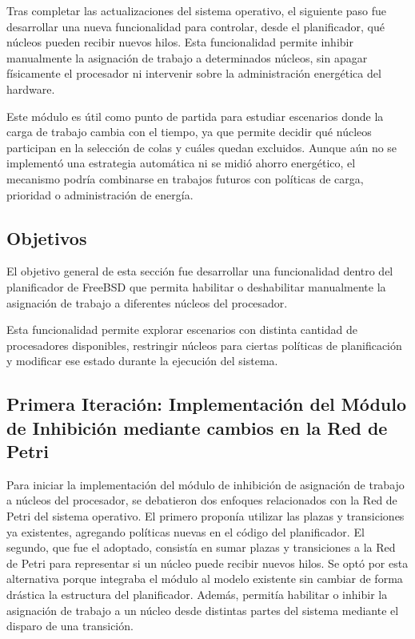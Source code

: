 Tras completar las actualizaciones del sistema operativo, el siguiente paso fue desarrollar una nueva funcionalidad para controlar, desde el planificador, qué núcleos pueden recibir nuevos hilos. Esta funcionalidad permite inhibir manualmente la asignación de trabajo a determinados núcleos, sin apagar físicamente el procesador ni intervenir sobre la administración energética del hardware.\par

Este módulo es útil como punto de partida para estudiar escenarios donde la carga de trabajo cambia con el tiempo, ya que permite decidir qué núcleos participan en la selección de colas y cuáles quedan excluidos. Aunque aún no se implementó una estrategia automática ni se midió ahorro energético, el mecanismo podría combinarse en trabajos futuros con políticas de carga, prioridad o administración de energía.\par

\subsection{Objetivos}

El objetivo general de esta sección fue desarrollar una funcionalidad dentro del planificador de FreeBSD que permita habilitar o deshabilitar manualmente la asignación de trabajo a diferentes núcleos del procesador.\par

Esta funcionalidad permite explorar escenarios con distinta cantidad de procesadores disponibles, restringir núcleos para ciertas políticas de planificación y modificar ese estado durante la ejecución del sistema.\par

\subsection{Primera Iteración: Implementación del Módulo de Inhibición mediante cambios en la Red de Petri}

Para iniciar la implementación del módulo de inhibición de asignación de trabajo a núcleos del procesador, se debatieron dos enfoques relacionados con la Red de Petri del sistema operativo. El primero proponía utilizar las plazas y transiciones ya existentes, agregando políticas nuevas en el código del planificador. El segundo, que fue el adoptado, consistía en sumar plazas y transiciones a la Red de Petri para representar si un núcleo puede recibir nuevos hilos. Se optó por esta alternativa porque integraba el módulo al modelo existente sin cambiar de forma drástica la estructura del planificador. Además, permitía habilitar o inhibir la asignación de trabajo a un núcleo desde distintas partes del sistema mediante el disparo de una transición.\par


